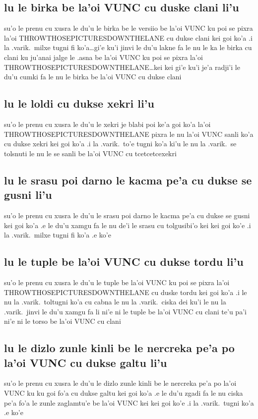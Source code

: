 \documentclass{report}
\begin{document}
\subsection{lu le birka be la'oi VUNC cu duske clani li'u}
su'o le prenu cu xusra le du'u le birka be le versiio be la'oi VUNC ku poi se pixra la'oi THROWTHOSEPICTURESDOWNTHELANE cu dukse clani kei goi ko'a  .i la .varik.\ milxe tugni fi ko'a\ldots gi'e ku'i jinvi le du'u lakne fa le nu le ka le birka cu clani ku ju'anai jalge le .asna be la'oi VUNC ku poi se pixra la'oi THROWTHOSEPICTURESDOWNTHELANE\ldots kei kei gi'e ku'i je'a radji'i le du'u cumki fa le nu le birka be la'oi VUNC cu dukse clani

\subsection{lu le loldi cu dukse xekri li'u}
su'o le prenu cu xusra le du'u le xekri je blabi poi ke'a goi ko'a la'oi THROWTHOSEPICTURESDOWNTHELANE pixra le nu la'oi VUNC sanli ko'a cu dukse xekri kei goi ko'a  .i la .varik.\ to'e tugni ko'a ki'u le nu la .varik.\ se tolsnuti le nu le se sanli be la'oi VUNC cu tcetcetcexekri

\subsection{lu le srasu poi darno le kacma pe'a cu dukse se gusni li'u}
su'o le prenu cu xusra le du'u le srasu poi darno le kacma pe'a cu dukse se gusni kei goi ko'a .e le du'u xamgu fa le nu de'i le srasu cu tolgusibi'o kei kei goi ko'e  .i la .varik.\ milxe tugni fi ko'a .e ko'e

\subsection{lu le tuple be la'oi VUNC cu dukse tordu li'u}
su'o le prenu cu xusra le du'u le tuple be la'oi VUNC ku poi se pixra la'oi THROWTHOSEPICTURESDOWNTHELANE cu duske tordu kei goi ko'a  .i le nu la .varik.\ toltugni ko'a cu cabna le nu la .varik.\ ciska dei ku'i le nu la .varik.\ jinvi  le du'u xamgu fa li ni'e ni le tuple be la'oi VUNC cu clani te'u pa'i ni'e ni le torso be la'oi VUNC cu clani

\subsection{lu le dizlo zunle kinli be le nercreka pe'a po la'oi VUNC cu dukse galtu li'u}
su'o le prenu cu xusra le du'u le dizlo zunle kinli be le nercreka pe'a po la'oi VUNC ku ku goi fo'a cu dukse galtu kei goi ko'a .e le du'u zgadi fa le nu ciska pe'a fo'a le zunle zaglamtu'e be la'oi VUNC kei kei goi ko'e  .i la .varik.\ tugni ko'a .e ko'e
\end{document}
